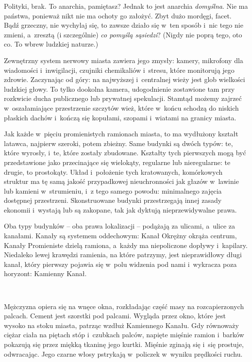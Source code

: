 \documentclass[oneside,polish,11pt,sfheadings]{mwbk}
\begin{document}
Polityki, brak. To anarchia, pamiętasz? Jednak to jest anarchia
\emph{domyślna}. Nie ma państwa, ponieważ nikt nie ma ochoty go założyć.
Zbyt dużo mordęgi, facet. Bądź grzeczny, nie wychylaj się, to zawsze
działo się w~ten sposób i~nic tego nie zmieni, a~zresztą (i szczególnie)
\emph{co pomyślą sąsiedzi}? (Nigdy nie poprą tego, oto co. To wbrew
ludzkiej naturze.)

Zewnętrzny system nerwowy miasta zawiera jego zmysły: kamery, mikrofony
dla wiadomości i~inwigilacji, czujniki chemikaliów i~stresu, które
monitorują jego zdrowie. Zaczynając od góry: na najwyższej i~centralnej
wieży jest glob wielkości ludzkiej głowy. To tylko dookolna kamera,
udogodnienie zostawione tam przy rozkwicie ducha publicznego lub
prywatnej spekulacji. Stamtąd możemy zajrzeć w~oszałamiające
przestrzenie szczytów wież, które w~końcu schodzą do niskich płaskich
dachów i~kończą się kopułami, szopami i~wiatami na granicy miasta.

Jak każde w~pięciu promienistych ramionach miasta, to ma wydłużony
kształt latawca, najpierw szeroki, potem zbieżny. Same budynki są dwóch
typów: te, które wyrosły, i~te, które zostały zbudowane. Kształty tych
pierwszych mogą być przedstawione jako przecinające się wielokąty,
regularne lub nieregularne: te drugie, to prostokąty. Układ i~położenie
tych kratowanych, komórkowych struktur ma tę samą jakość przypadkowej
nieuchronności jak głazów w~lawinie lub kamieni w~strumieniu, i~z tego
samego powodu: minimalnego zajęcia dostępnej przestrzeni. Skonstruowane
budynki przestrzegają innej zasady ekonomii i~wystają lub są zakopane,
tak jak dyktują nieprzewidywalne prawa.

Oba typy budynków -- oba prawa lokalizacji -- podążają za ulicami, a~ulice
za kanałami. Kanały są systemem oddechowym: Kanał Okrężny okrąża
centrum, Kanały Promieniste dzielą ramiona, a~każdy ma niepoliczone
dopływy i~kapilary. Niedaleko lewej krawędzi ramienia, na które
patrzymy, jest nieprawidłowy długi kanał, który pierwszy pojawia się w~polu widzenia pod nami i~wykracza poza horyzont: Kamienny Kanał.

~

Mężczyzna opiera się na wnęce okna, rozkładając część masy na
rozcapierzonych palcach. Cement jest szorstki pod palcami. Wygląda przez
okno, które jest wysoko na stoku miasta, patrząc wzdłuż Kamiennego
Kanału. Gdy równoważy ciężar ciała na piętach stóp i~czubkach palców,
napięte mięśnie ramion i~barków pokazują się przez miękką tkaninę jego
kurtki. Mięśnie zginają się i~się prostuje, odwracając. Jego czarne
włosy pstrykają w~policzek w~wyniku prędkości ruchu.
\end{document}

